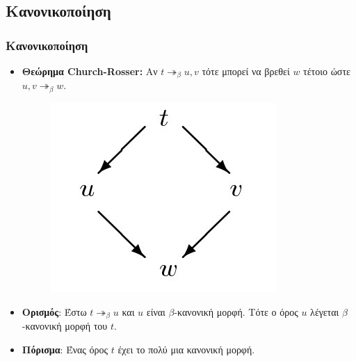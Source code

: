 \documentclass{beamer}
\begin{document}
\subsection{Κανονικοποίηση}

\begin{frame}
\frametitle{Κανονικοποίηση}
\begin{itemize}
\item \textbf{Θεώρημα Church-Rosser:} Αν  $t \twoheadrightarrow _\beta u, v$  τότε μπορεί να βρεθεί $w$ τέτοιο ώστε $ u, v \twoheadrightarrow _\beta w$.\pause

\begin{figure}
\includegraphics[scale=0.3]{CR.jpg} 
\end{figure}\pause
\item \textbf{Ορισμός}: Έστω $t \twoheadrightarrow _\beta u$ και $u$ είναι $\beta$-κανονική μορφή. Τότε ο όρος $u$ λέγεται $\beta$-κανονική μορφή του $t$.\pause
\item \textbf{Πόρισμα}: Ένας όρος $t$ έχει το πολύ μια κανονική μορφή. 
\end{itemize}
\end{frame}
\end{document}
